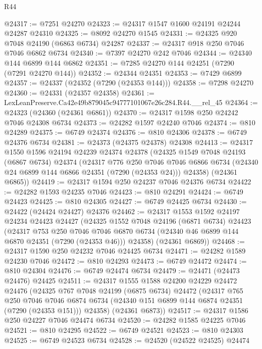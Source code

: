\begin{lexlean}{R44}
\begin{coremodule}
{@24317 := @7251 @24270
@24323 := @24317 @1547 @1600 @24191 @24244 @24287 @24310
@24325 := @8092 @24270 @1545
@24331 := @24325 @920 @7048 @24190 (@6863 @6734) @24287
@24337 := @24317 @918 @250 @7046 @7046 @6862 @6734
@24340 := @7397 @24270 @242 @7046
@24344 := @24340 @144 @6899 @144 @6862
@24351 := @7285 @24270 @144 @24251 (@7290 (@7291 @24270 @144))
@24352 := @24344 @24351
@24353 := @7429 @6899
@24357 := @24337 (@24352 (@7290 (@24353 @144)))
@24358 := @7298 @24270
@24360 := @24331 (@24357 @24358)
@24361 := LexLeanPreserve.Ca42e49b879045c94777101067e26c284.R44.__rel_45
@24364 := @24323 (@24360 (@24361 @6861))
@24370 := @24317 @1598 @250 @24242 @7046 @24308 @6734
@24373 := @24282 @1597 @24240 @7046
@24374 := @810 @24289
@24375 := @6749 @24374
@24376 := @810 @24306
@24378 := @6749 @24376 @6734
@24381 := @24373 (@24375 @24378) @24308
@24413 := @24317
    @1550
    @1596
    @24194
    @24239
    @24374
    @24378
    (@24325
      @1549
      @7048
      @24193
      (@6867 @6734)
      @24374
      (@24317
        @776
        @250
        @7046
        @7046
        @6866
        @6734
        (@24340 @24 @6899 @144 @6866 @24351 (@7290 (@24353 @24)))
        @24358)
      (@24361 @6865))
@24419 := @24317 @1594 @250 @24237 @7046 @24376 @6734
@24422 := @24282 @1593 @24235 @7046
@24423 := @810 @24291
@24424 := @6749 @24423
@24425 := @810 @24305
@24427 := @6749 @24425 @6734
@24430 := @24422 (@24424 @24427) @24376
@24462 := @24317
    @1553
    @1592
    @24197
    @24234
    @24423
    @24427
    (@24325
      @1552
      @7048
      @24196
      (@6871 @6734)
      @24423
      (@24317
        @753
        @250
        @7046
        @7046
        @6870
        @6734
        (@24340 @46 @6899 @144 @6870 @24351 (@7290 (@24353 @46)))
        @24358)
      (@24361 @6869))
@24468 := @24317 @1590 @250 @24232 @7046 @24425 @6734
@24471 := @24282 @1589 @24230 @7046
@24472 := @810 @24293
@24473 := @6749 @24472
@24474 := @810 @24304
@24476 := @6749 @24474 @6734
@24479 := @24471 (@24473 @24476) @24425
@24511 := @24317
    @1555
    @1588
    @24200
    @24229
    @24472
    @24476
    (@24325
      @767
      @7048
      @24199
      (@6875 @6734)
      @24472
      (@24317
        @765
        @250
        @7046
        @7046
        @6874
        @6734
        (@24340 @151 @6899 @144 @6874 @24351 (@7290 (@24353 @151)))
        @24358)
      (@24361 @6873))
@24517 := @24317 @1586 @250 @24227 @7046 @24474 @6734
@24520 := @24282 @1585 @24225 @7046
@24521 := @810 @24295
@24522 := @6749 @24521
@24523 := @810 @24303
@24525 := @6749 @24523 @6734
@24528 := @24520 (@24522 @24525) @24474
}
\end{coremodule}
\end{lexlean}
